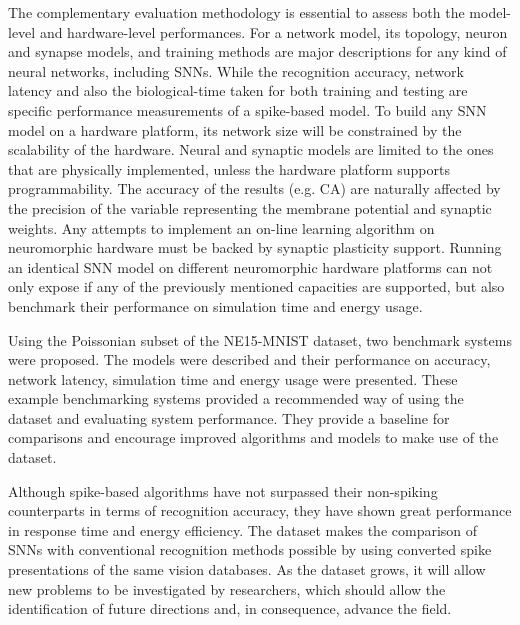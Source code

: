 The complementary evaluation methodology is essential to assess both the model-level and hardware-level performances.
For a network model, its topology, neuron and synapse models, and training methods are major descriptions for any kind of neural networks, including SNNs.
While the recognition accuracy, network latency and also the biological-time taken for both training and testing are specific performance measurements of a spike-based model.
To build any SNN model on a hardware platform, its network size will be constrained by the scalability of the hardware. Neural and synaptic models are limited to the ones that are physically implemented, unless the hardware platform supports programmability.
The accuracy of the results (e.g. CA) are naturally affected by the precision of the variable representing the membrane potential and synaptic weights.
Any attempts to implement an on-line learning algorithm on neuromorphic hardware must be backed by synaptic plasticity support.
Running an identical SNN model on different neuromorphic hardware platforms can not only expose if any of the previously mentioned capacities are supported, but also benchmark their performance on simulation time and energy usage.

Using the Poissonian subset of the NE15-MNIST dataset, two benchmark systems were proposed. 
The models were described and their performance on accuracy, network latency, simulation time and energy usage were presented.
These example benchmarking systems provided a recommended way of using the dataset and evaluating system performance.
They provide a baseline for comparisons and encourage improved algorithms and models to make use of the dataset.

Although spike-based algorithms have not surpassed their non-spiking counterparts in terms of recognition accuracy, they have shown great performance in response time and energy efficiency.
The dataset makes the comparison of SNNs with conventional recognition methods possible by using converted spike presentations of the same vision databases.
As the dataset grows, it will allow new problems to be investigated by researchers, which should allow the identification of future directions and, in consequence, advance the field.

